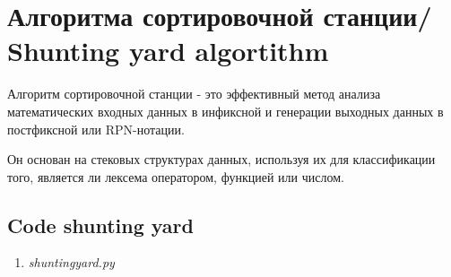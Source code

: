 
\section{Алгоритма сортировочной станции/ Shunting yard algortithm}

Алгоритм сортировочной станции - это эффективный метод анализа математических
входных данных в инфиксной и генерации выходных данных в
постфиксной или RPN-нотации.

Он основан на стековых структурах данных, используя их для
классификации того, является ли лексема оператором, функцией или числом.

\subsection{Code shunting yard}

\begin{enumerate}

  \item \textit{shuntingyard.py}

  

\end{enumerate}
